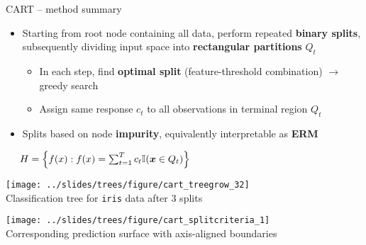 \begin{frame}{CART -- method summary}

\footnotesize

 
  

\medskip

\begin{itemize}
  \item Starting from root node containing all data, perform repeated 
  \textbf{binary splits}, subsequently dividing input space into
  \textbf{rectangular partitions} $Q_t$
  \begin{itemize}
    \item In each step, find \textbf{optimal split} (feature-threshold 
    combination) $\rightarrow$ greedy search
    \item Assign same response $c_t$ to all observations in terminal region 
    $Q_t$
  \end{itemize}
  \item Splits based on node \textbf{impurity}, equivalently interpretable as 
  \textbf{ERM}
\end{itemize}

\medskip
 
 ~~
$H = \left\{ f(x): f(x) = \sum_{t = 1}^T c_t \mathbb{I}(\bm{x} \in Q_t) 
\right\}$

\medskip

\begin{minipage}[b]{0.5\textwidth}
  \texttt{[image: ../slides/trees/figure/cart\_treegrow\_32]} \\
  \tiny{Classification tree for \texttt{iris} data after 3 splits}
\end{minipage}
\begin{minipage}[b]{0.49\textwidth}
  \texttt{[image: 
  ../slides/trees/figure/cart\_splitcriteria\_1]} \\
  \tiny{Corresponding prediction surface with axis-aligned boundaries}
\end{minipage}%

\end{frame}



